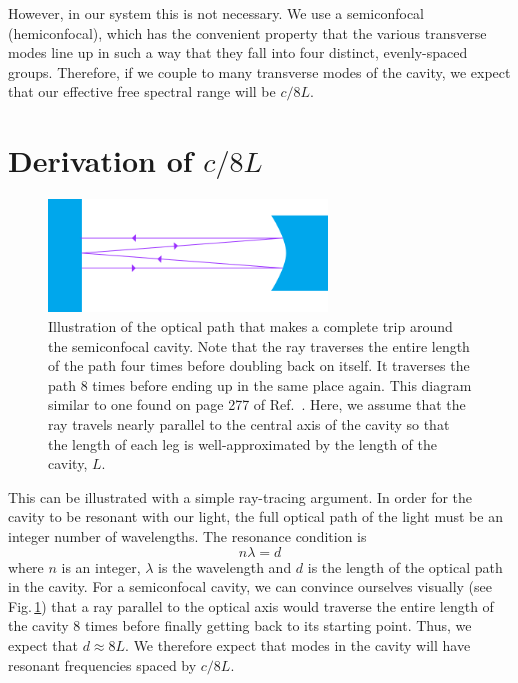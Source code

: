 However, in our system this is not necessary. We use a semiconfocal (hemiconfocal), which has the convenient property that the various transverse modes line up in such a way that they fall into four distinct, evenly-spaced groups. Therefore, if we couple to many transverse modes of the cavity, we expect that our effective free spectral range will be $c/8L$.

\section{Derivation of $c/8L$}
\begin{figure}
\centerline{\includegraphics[height=3cm]{spectrum_analyzer_path.png}}
\caption{\label{completePath}Illustration of the optical path that makes a complete trip around the semiconfocal cavity. Note that the ray traverses the entire length of the path four times before doubling back on itself. It traverses the path 8 times before ending up in the same place again. This diagram similar to one found on page 277 of Ref.\ \cite{lasersMilonniEberly}. Here, we assume that the ray travels nearly parallel to the central axis of the cavity so that the length of each leg is well-approximated by the length of the cavity, $L$.}
\end{figure}

This can be illustrated with a simple ray-tracing argument. 
In order for the cavity to be resonant with our light, the full optical path of the light must be an integer number of wavelengths. The resonance condition is 
\begin{equation}
n \lambda = d
\end{equation}
where $n$ is an integer, $\lambda$ is the wavelength and $d$ is the length of the optical path in the cavity. 
For a semiconfocal cavity, we can convince ourselves visually (see Fig.\,\ref{completePath}) that a ray parallel to the optical axis would traverse the entire length of the cavity 8 times before finally getting back to its starting point. Thus, we expect that $d\approx 8L$.
We therefore expect that modes in the cavity will have resonant frequencies spaced by $c/8L$. 


